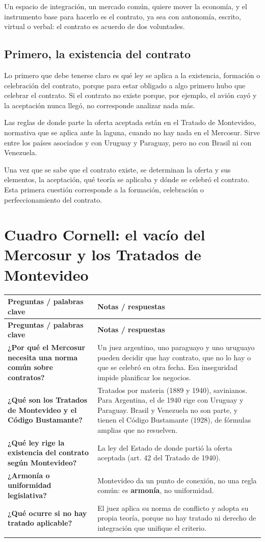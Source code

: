 \documentclass[12pt,oneside]{book}
\makeatletter
\newcommand{\cornellstart}{%
\begin{longtable}{@{}>{\raggedright\arraybackslash}p{0.26\textwidth}%
                  >{\raggedright\arraybackslash}p{\dimexpr0.74\textwidth-2\tabcolsep\relax}@{}}
\toprule
\textbf{Preguntas / palabras clave} & \textbf{Notas / respuestas} \\
\midrule
\endfirsthead
\toprule
\textbf{Preguntas / palabras clave} & \textbf{Notas / respuestas} \\
\midrule
\endhead
}
\newcommand{\cq}[2]{\textbf{#1} & #2 \\[0.6em]}
\newcommand{\cornellend}[1]{%
\midrule
\multicolumn{2}{@{}p{\textwidth}@{}}{\textbf{Resumen:} #1} \\
\bottomrule
\end{longtable}
}
\makeatother
\begin{document}
Un espacio de integración, un mercado común, quiere mover la economía, y el instrumento base para hacerlo es el contrato, ya sea con autonomía, escrito, virtual o verbal: el contrato es acuerdo de dos voluntades.

\subsection{Primero, la existencia del contrato}

Lo primero que debe tenerse claro es qué ley se aplica a la existencia, formación o celebración del contrato, porque para estar obligado a algo primero hubo que celebrar el contrato. Si el contrato no existe porque, por ejemplo, el avión cayó y la aceptación nunca llegó, no corresponde analizar nada más.

Las reglas de donde parte la oferta aceptada están en el Tratado de Montevideo, normativa que se aplica ante la laguna, cuando no hay nada en el Mercosur. Sirve entre los países asociados y con Uruguay y Paraguay, pero no con Brasil ni con Venezuela.

Una vez que se sabe que el contrato existe, se determinan la oferta y sus elementos, la aceptación, qué teoría se aplicaba y dónde se celebró el contrato. Esta primera cuestión corresponde a la formación, celebración o perfeccionamiento del contrato.

\section{Cuadro Cornell: el vacío del Mercosur y los Tratados de Montevideo}

\cornellstart
\cq{¿Por qué el Mercosur necesita una norma común sobre contratos?}{Un juez argentino, uno paraguayo y uno uruguayo pueden decidir que hay contrato, que no lo hay o que se celebró en otra fecha. Esa inseguridad impide planificar los negocios.}
\cq{¿Qué son los Tratados de Montevideo y el Código Bustamante?}{Tratados por materia (1889 y 1940), savinianos. Para Argentina, el de 1940 rige con Uruguay y Paraguay. Brasil y Venezuela no son parte, y tienen el Código Bustamante (1928), de fórmulas amplias que no resuelven.}
\cq{¿Qué ley rige la existencia del contrato según Montevideo?}{La ley del Estado de donde partió la oferta aceptada (art. 42 del Tratado de 1940).}
\cq{¿Armonía o uniformidad legislativa?}{Montevideo da un punto de conexión, no una regla común: es \textbf{armonía}, no uniformidad.}
\cq{¿Qué ocurre si no hay tratado aplicable?}{El juez aplica su norma de conflicto y adopta su propia teoría, porque no hay tratado ni derecho de integración que unifique el criterio.}
\cornellend{El Mercosur no tiene una norma común sobre contratos, y los Estados difieren en el momento y el lugar en que lo consideran perfeccionado. Para suplir ese vacío se recurre a los Tratados de Montevideo, que solo vinculan a algunos países y que ofrecen armonía legislativa (la ley del Estado de donde partió la oferta) y no uniformidad.}
\end{document}
